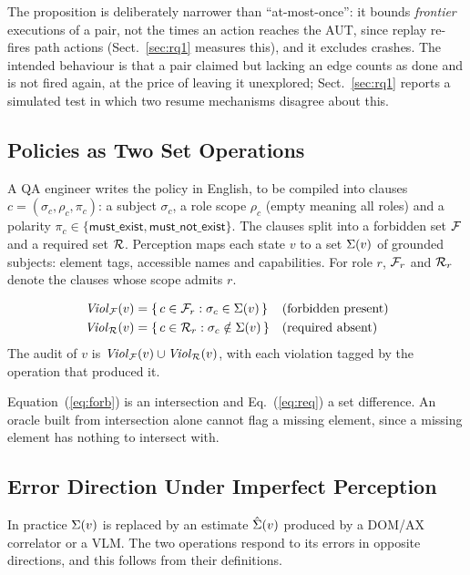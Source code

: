 The proposition is deliberately narrower than ``at-most-once'': it bounds
\emph{frontier} executions of a pair, not the times an action reaches the AUT, since
replay re-fires path actions (Sect.~\ref{sec:rq1} measures this), and it excludes
crashes. The intended behaviour is that a pair claimed but lacking an edge counts
as done and is not fired again, at the price of leaving it unexplored;
Sect.~\ref{sec:rq1} reports a simulated test in which two resume mechanisms
disagree about this.

\subsection{Policies as Two Set Operations}

A QA engineer writes the policy in English, to be compiled into clauses
$c=(\sigma_c,\rho_c,\pi_c)$: a subject $\sigma_c$, a role scope $\rho_c$ (empty
meaning all roles) and a polarity $\pi_c\in\{\textsf{must\_exist},\textsf{must\_not\_exist}\}$.
The clauses split into a forbidden set $\mathcal{F}$ and a required set $\mathcal{R}$.
Perception maps each state $v$ to a set $\Sigma(v)$ of grounded subjects: element
tags, accessible names and capabilities. For role $r$, $\mathcal{F}_r$ and $\mathcal{R}_r$
denote the clauses whose scope admits $r$.

\begin{definition}
\begin{align}
\mathit{Viol}_{\mathcal{F}}(v) &= \{\,c\in\mathcal{F}_r : \sigma_c\in\Sigma(v)\,\}
  && \text{(forbidden present)}\label{eq:forb}\\
\mathit{Viol}_{\mathcal{R}}(v)  &= \{\,c\in\mathcal{R}_r : \sigma_c\notin\Sigma(v)\,\}
  && \text{(required absent)}\label{eq:req}
\end{align}
The audit of $v$ is $\mathit{Viol}_{\mathcal{F}}(v)\cup\mathit{Viol}_{\mathcal{R}}(v)$, with each
violation tagged by the operation that produced it.
\end{definition}

Equation~(\ref{eq:forb}) is an intersection and Eq.~(\ref{eq:req}) a set
difference. An oracle built from intersection alone cannot flag a missing element,
since a missing element has nothing to intersect with.

\subsection{Error Direction Under Imperfect Perception}
\label{sec:asym}

In practice $\Sigma(v)$ is replaced by an estimate $\hat{\Sigma}(v)$ produced by a
DOM/AX correlator or a VLM. The two operations respond to its errors in opposite
directions, and this follows from their definitions.

